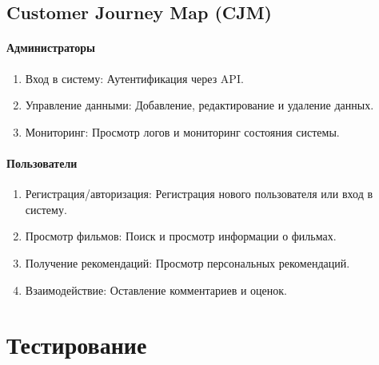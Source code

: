 \hypertarget{customer-journey-map-cjm}{%
\subsection*{Customer Journey Map
(CJM)}\label{customer-journey-map-cjm}}

\hypertarget{ux430ux434ux43cux438ux43dux438ux441ux442ux440ux430ux442ux43eux440ux44b}{%
\paragraph{Администраторы}\label{ux430ux434ux43cux438ux43dux438ux441ux442ux440ux430ux442ux43eux440ux44b}}

\begin{enumerate}
\def\labelenumi{\arabic{enumi}.}
\tightlist
\item
  Вход в систему: Аутентификация через API.
\item
  Управление данными: Добавление, редактирование и удаление
  данных.
\item
  Мониторинг: Просмотр логов и мониторинг состояния системы.
\end{enumerate}

\hypertarget{ux43fux43eux43bux44cux437ux43eux432ux430ux442ux435ux43bux438}{%
\paragraph{Пользователи}\label{ux43fux43eux43bux44cux437ux43eux432ux430ux442ux435ux43bux438}}

\begin{enumerate}
\def\labelenumi{\arabic{enumi}.}
\tightlist
\item
  Регистрация/авторизация: Регистрация нового пользователя или
  вход в систему.
\item
  Просмотр фильмов: Поиск и просмотр информации о фильмах.
\item
  Получение рекомендаций: Просмотр персональных рекомендаций.
\item
  Взаимодействие: Оставление комментариев и оценок.
\end{enumerate}

\hypertarget{ux442ux435ux441ux442ux438ux440ux43eux432ux430ux43dux438ux435}{%
\section{Тестирование}\label{ux442ux435ux441ux442ux438ux440ux43eux432ux430ux43dux438ux435}}

